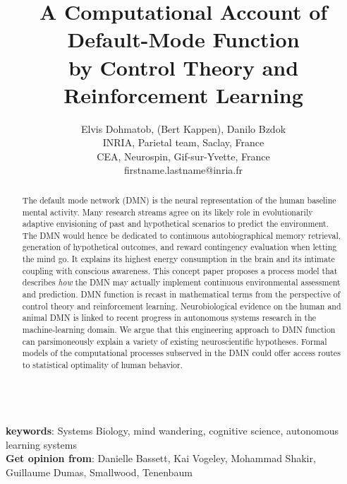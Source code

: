 \documentclass{article} %
\title{A Computational Account of Default-Mode Function\\
by Control Theory and Reinforcement Learning}
\begin{document}
\author{Elvis Dohmatob, (Bert Kappen), Danilo Bzdok\\
  INRIA, Parietal team, Saclay, France\\
  CEA, Neurospin, Gif-sur-Yvette, France\\
  firstname.lastname@inria.fr}

\maketitle


\begin{abstract}
The default mode network (DMN) is the neural representation of the human
baseline mental activity.
%
Many research streams agree on its likely role in evolutionarily adaptive
envisioning of past and hypothetical scenarios to predict the environment.
The DMN would hence be dedicated to continuous autobiographical memory retrieval,
generation of hypothetical outcomes,
and reward contingency evaluation when letting the mind go.
It explains its highest energy consumption in the brain and
its intimate coupling with conscious awareness.
%
This concept paper proposes a process model that describes
\textit{how} the DMN may actually implement continuous
environmental assessment and prediction.
DMN function is recast in mathematical terms
from the perspective of control theory and
reinforcement learning.
Neurobiological evidence on the human and animal DMN
is linked to recent progress in autonomous systems research
in the machine-learning domain.
We argue that this engineering approach to DMN function can parsimoneously
explain a variety of existing neuroscientific hypotheses.
%
Formal models of the computational processes subserved in the DMN
could offer access routes to statistical optimality
of human behavior.

\end{abstract}

\textbf{\\keywords}: Systems Biology, mind wandering, cognitive science,
autonomous learning systems
\textbf{\\Get opinion from}: Danielle Bassett, Kai Vogeley, Mohammad Shakir,
Guillaume Dumas, Smallwood, Tenenbaum

\tableofcontents
\end{document}
